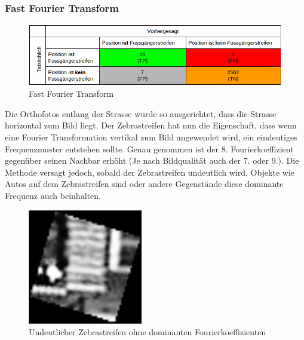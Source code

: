 \subsubsection{Fast Fourier Transform}	
\begin{figure}[H]
\includegraphics[width=\textwidth]{images/fast_fourier_conf.png}
\caption[Fast Fourier Transform]{Fast Fourier Transform}
\end{figure}
Die Orthofotos entlang der Strasse wurde so ausgerichtet, dass die Strasse horizontal zum Bild liegt. Der Zebrastreifen hat nun die Eigenschaft, dass wenn eine Fourier Transformation vertikal zum Bild angewendet wird, ein eindeutiges Frequenzmuster entstehen sollte. Genau genommen ist der 8. Fourierkoeffizient gegenüber seinen Nachbar erhöht (Je nach Bildqualität auch der 7. oder 9.).
Die Methode versagt jedoch, sobald der Zebrastreifen undeutlich wird, Objekte wie Autos auf dem Zebrastreifen sind oder andere Gegenstände diese dominante Frequenz auch beinhalten.
\begin{figure}[H]
	\centering
	\includegraphics[width=5cm]{images/Unsharp_Crosswalk2.png}\caption[Scale-invariant Feature Transform]{Undeutlicher Zebrastreifen ohne dominanten Fourierkoeffizienten}
\end{figure}
